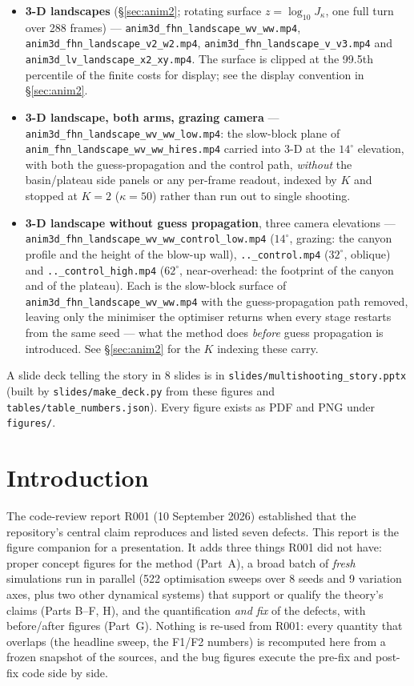\documentclass[10pt]{article}
\begin{document}
\begin{itemize}[leftmargin=1.4em, itemsep=0pt]
\item \textbf{3-D landscapes} (\S\ref{sec:anim2}; rotating surface $z=\log_{10}J_\kappa$, one full turn over 288 frames) --- \texttt{anim3d\_fhn\_landscape\_wv\_ww.mp4}, \texttt{anim3d\_fhn\_landscape\_v2\_w2.mp4}, \texttt{anim3d\_fhn\_landscape\_v\_v3.mp4} and \texttt{anim3d\_lv\_landscape\_x2\_xy.mp4}. The surface is clipped at the 99.5th percentile of the finite costs for display; see the display convention in \S\ref{sec:anim2}.
\item \textbf{3-D landscape, both arms, grazing camera} --- \texttt{anim3d\_fhn\_landscape\_wv\_ww\_low.mp4}: the slow-block plane of \texttt{anim\_fhn\_landscape\_wv\_ww\_hires.mp4} carried into 3-D at the $14^\circ$ elevation, with both the guess-propagation and the control path, \emph{without} the basin/plateau side panels or any per-frame readout, indexed by $K$ and stopped at $K=2$ ($\kappa=50$) rather than run out to single shooting.
\item \textbf{3-D landscape without guess propagation}, three camera elevations --- \texttt{anim3d\_fhn\_landscape\_wv\_ww\_control\_low.mp4} ($14^\circ$, grazing: the canyon profile and the height of the blow-up wall), \texttt{..\_control.mp4} ($32^\circ$, oblique) and \texttt{..\_control\_high.mp4} ($62^\circ$, near-overhead: the footprint of the canyon and of the plateau). Each is the slow-block surface of \texttt{anim3d\_fhn\_landscape\_wv\_ww.mp4} with the guess-propagation path removed, leaving only the minimiser the optimiser returns when every stage restarts from the same seed --- what the method does \emph{before} guess propagation is introduced. See \S\ref{sec:anim2} for the $K$ indexing these carry.
\end{itemize}
A slide deck telling the story in 8 slides is in \texttt{slides/multishooting\_story.pptx} (built by \texttt{slides/make\_deck.py} from these figures and \texttt{tables/table\_numbers.json}). Every figure exists as PDF and PNG under \texttt{figures/}.

\tableofcontents

\section{Introduction}
The code-review report R001 (10 September 2026) established that the repository's central claim reproduces and listed seven defects. This report is the figure companion for a presentation. It adds three things R001 did not have: proper concept figures for the method (Part~A), a broad batch of \emph{fresh} simulations run in parallel (522 optimisation sweeps over 8 seeds and 9 variation axes, plus two other dynamical systems) that support or qualify the theory's claims (Parts B--F, H), and the quantification \emph{and fix} of the defects, with before/after figures (Part~G). Nothing is re-used from R001: every quantity that overlaps (the headline sweep, the F1/F2 numbers) is recomputed here from a frozen snapshot of the sources, and the bug figures execute the pre-fix and post-fix code side by side.
\end{document}
